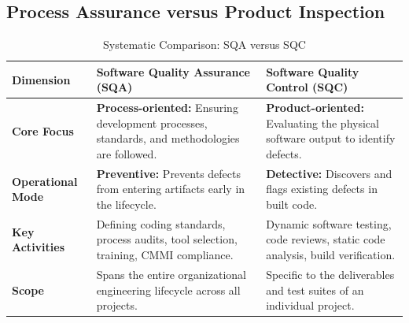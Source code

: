 \subsection{Process Assurance versus Product Inspection}
\begin{table}[htbp]
\centering
\small
\caption{Systematic Comparison: SQA versus SQC}
\label{tab:sqa_vs_sqc}
\begin{tabularx}{\textwidth}{l p{5cm} X}
\toprule
\textbf{Dimension} & \textbf{Software Quality Assurance (SQA)} & \textbf{Software Quality Control (SQC)} \\
\midrule
\textbf{Core Focus} & \textbf{Process-oriented:} Ensuring development processes, standards, and methodologies are followed. & \textbf{Product-oriented:} Evaluating the physical software output to identify defects. \\
\textbf{Operational Mode} & \textbf{Preventive:} Prevents defects from entering artifacts early in the lifecycle. & \textbf{Detective:} Discovers and flags existing defects in built code. \\
\textbf{Key Activities} & Defining coding standards, process audits, tool selection, training, CMMI compliance. & Dynamic software testing, code reviews, static code analysis, build verification. \\
\textbf{Scope} & Spans the entire organizational engineering lifecycle across all projects. & Specific to the deliverables and test suites of an individual project. \\
\bottomrule
\end{tabularx}
\end{table}


